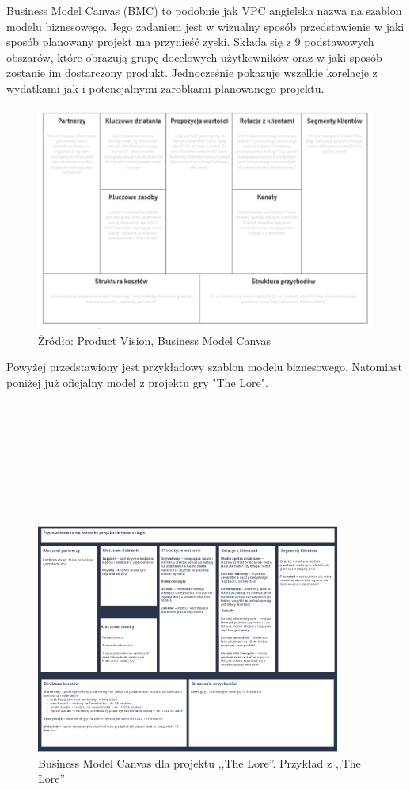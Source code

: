 \documentclass[oneside,polski,logo]{amuthesis}
\begin{document}
Business Model Canvas (BMC) to podobnie jak VPC angielska nazwa na szablon modelu biznesowego. Jego zadaniem jest w wizualny sposób przedstawienie w jaki sposób planowany projekt ma przynieść zyski. Składa się z 9 podstawowych obszarów, które obrazują grupę docelowych użytkowników oraz w jaki sposób zostanie im dostarczony produkt. Jednocześnie pokazuje wszelkie korelacje z wydatkami jak i potencjalnymi zarobkami planowanego projektu.\cite{BMC}\\


\begin{figure}[h]
	\centering
	\includegraphics[width=15cm]{images/hyps/BMC.png}
	\caption{Źródło: Product Vision, Business Model Canvas}
\end{figure}

Powyżej przedstawiony jest przykładowy szablon modelu biznesowego. Natomiast poniżej już oficjalny model z projektu gry "The Lore".\\ \\ \\ \\ \\ \\ \\ \\ \\

\begin{figure}[h]
	\centering
	\includegraphics[width=10cm]{images/hyps/BMC - The Lore.png}
	\caption{Business Model Canvas dla projektu ,,The Lore''. Przykład z ,,The Lore''}
\end{figure}
\end{document}
